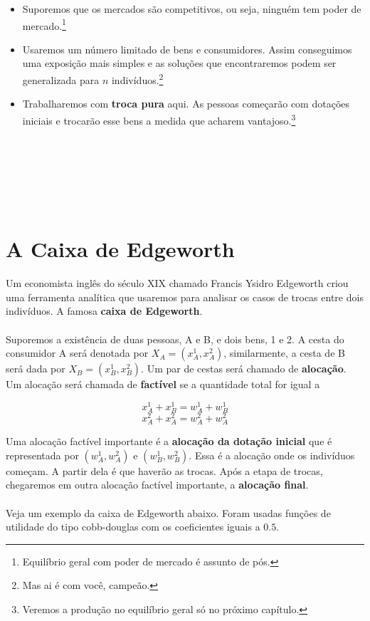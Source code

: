 \documentclass[a4paper,11pt,oneside]{book}
\theoremstyle{definition}
\theoremstyle{break}
\begin{document}
\begin{itemize}
\item Suporemos que os mercados são competitivos, ou seja, ninguém tem poder de mercado.\footnote{Equilíbrio geral com poder de mercado é assunto de pós.}
\item Usaremos um número limitado de bens e consumidores. Assim conseguimos uma exposição mais simples e as soluções que encontraremos podem ser generalizada para $n$ indivíduos.\footnote{Mas ai é com você, campeão.}
\item Trabalharemos com \textbf{troca pura} aqui. As pessoas começarão com dotações iniciais e trocarão esse bens a medida que acharem vantajoso.\footnote{Veremos a produção no equilíbrio geral só no próximo capítulo.}
\end{itemize}

\ 
\\
\\
\ 
\\
\\
\ 
\section{A Caixa de Edgeworth}

Um economista inglês do século XIX chamado Francis Ysidro Edgeworth criou uma ferramenta analítica que usaremos para analisar os casos de trocas entre dois indivíduos. A famosa \textbf{caixa de Edgeworth}.
\\
\\
Suporemos a existência de duas pessoas, A e B, e dois bens, 1 e 2. A cesta do consumidor A será denotada por $X_A = (x_A^1, x_A^2)$, similarmente, a cesta de B será dada por $X_B = (x_B^1, x_B^2)$. Um par de cestas será chamado de \textbf{alocação}. Um alocação será chamada de \textbf{factível} se a quantidade total for igual a 

$$x_A^1 + x_B^1 = w_A^1 + w_B^1$$
$$x_A^2 + x_A^2 = w_A^2 + w_A^2$$

Uma alocação factível importante é a \textbf{alocação da dotação inicial} que é representada por $(w_A^1, w_A^2)$ e $(w_B^1, w_B^2)$. Essa é a alocação onde os indivíduos começam. A partir dela é que haverão as trocas. Após a etapa de trocas, chegaremos em outra alocação factível importante, a \textbf{alocação final}.
\\
\\
Veja um exemplo da caixa de Edgeworth abaixo. Foram usadas funções de utilidade do tipo cobb-douglas com os coeficientes iguais a $0.5$.
\end{document}

